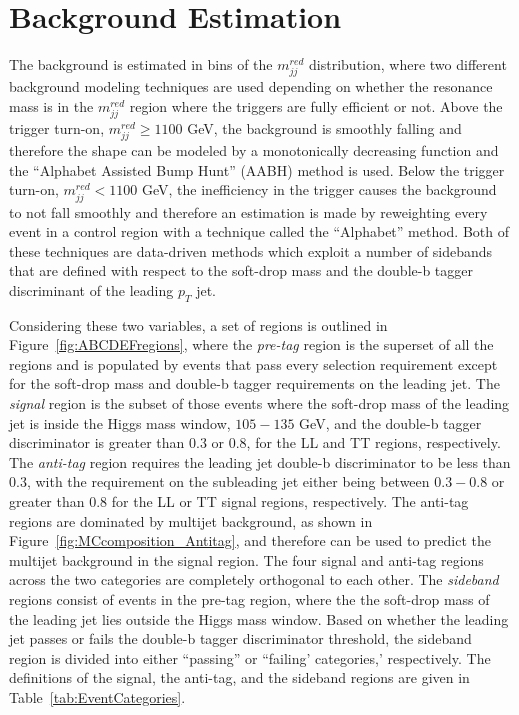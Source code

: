 
\section{Background Estimation}
\label{sec:BkgEst}

The background is estimated in bins of the $m_{jj}^{red}$ distribution, where two different background modeling techniques are used depending on whether the resonance mass is in the $m_{jj}^{red}$ region where the triggers are fully efficient or not. Above the trigger turn-on, $m_{jj}^{red} \ge 1100$ GeV, the background is smoothly falling and therefore the shape can be modeled by a monotonically decreasing function and the ``Alphabet Assisted Bump Hunt'' (AABH) method is used. Below the trigger turn-on, $m_{jj}^{red} < 1100$ GeV, the inefficiency in the trigger causes the background to not fall smoothly and therefore an estimation is made by reweighting every event in a control region with a technique called the ``Alphabet'' method. Both of these techniques are data-driven methods which exploit a number of sidebands that are defined with respect to the soft-drop mass and the double-b tagger discriminant of the leading $p_{T}$ jet. 

Considering these two variables, a set of regions is outlined in Figure~\ref{fig:ABCDEFregions}, where the \textit{pre-tag} region is the superset of all the regions and is populated by events that pass every selection requirement except for the soft-drop mass and double-b tagger requirements on the leading jet. The \textit{signal} region is the subset of those events where the soft-drop mass of the leading jet is inside the Higgs mass window, $105-135$ GeV, and the double-b tagger discriminator is greater than 0.3 or 0.8, for the LL and TT regions, respectively. The \textit{anti-tag} region requires the leading jet double-b discriminator to be less than 0.3, with the requirement on the subleading jet either being between $0.3-0.8$ or greater than 0.8 for the LL or TT signal regions, respectively. The anti-tag regions are dominated by multijet background, as shown in Figure~\ref{fig:MCcomposition_Antitag}, and therefore can be used to predict the multijet background in the signal region. The four signal and anti-tag regions across the two categories are completely orthogonal to each other. The \textit{sideband} regions consist of events in the pre-tag region, where the the soft-drop mass of the leading jet lies outside the Higgs mass window. Based on whether the leading jet passes or fails the double-b tagger discriminator threshold, the sideband region is divided into either ``passing'' or ``failing' categories,' respectively. The definitions of the signal, the anti-tag, and the sideband regions are given in Table~\ref{tab:EventCategories}.

